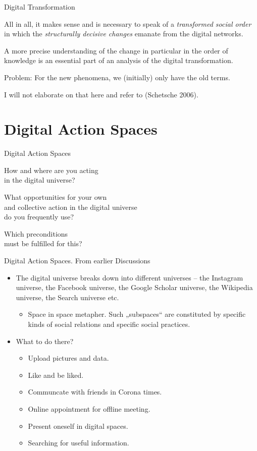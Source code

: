 \documentclass{beamer}
\begin{document}
\begin{frame}{Digital Transformation}

All in all, it makes sense and is necessary to speak of a \emph{transformed
  social order} in which the \emph{structurally decisive changes} emanate from
the digital networks.

  A more precise understanding of the change in particular in the order of
  knowledge is an essential part of an analysis of the digital transformation.

  Problem: For the new phenomena, we (initially) only have the old terms.

  I will not elaborate on that here and refer to (Schetsche 2006).

\end{frame}

\section{Digital Action Spaces}
\begin{frame}{Digital Action Spaces}\centering\Large\bf

  How and where are you acting\\ in the digital universe?

  What opportunities for your own\\ and collective action in the digital
  universe\\ do you frequently use?

  Which preconditions\\ must be fulfilled for this?
\end{frame}
\begin{frame}{Digital Action Spaces. From earlier Discussions}
  \begin{itemize}
  \item The digital universe breaks down into different universes -- the
    Instagram universe, the Facebook universe, the Google Scholar universe,
    the Wikipedia universe, the Search universe etc.
    \begin{itemize}
    \item Space in space metapher. Such „subspaces“ are constituted by
      specific kinds of social relations and specific social practices.
    \end{itemize}
  \item What to do there?
    \begin{itemize}
    \item Upload pictures and data.
    \item Like and be liked.
    \item Communcate with friends in Corona times.
    \item Online appointment for offline meeting.
    \item Present oneself in digital spaces.
    \item Searching for useful information.
    \end{itemize}
  \end{itemize}
\end{frame}
\end{document}
